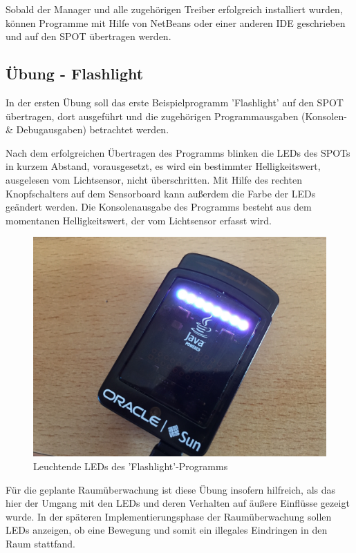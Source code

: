 Sobald der Manager und alle zugehörigen Treiber erfolgreich installiert wurden, können Programme mit Hilfe von NetBeans oder einer anderen IDE geschrieben und auf den SPOT übertragen werden.

\subsection{Übung - Flashlight}\label{s:Uebung1}

In der ersten Übung soll das erste Beispielprogramm 'Flashlight' auf den SPOT übertragen, dort ausgeführt und die zugehörigen Programmausgaben (Konsolen- \& Debugausgaben) betrachtet werden. 

Nach dem erfolgreichen Übertragen des Programms blinken die LEDs des SPOTs in kurzem Abstand, vorausgesetzt, es wird ein bestimmter Helligkeitswert, ausgelesen vom Lichtsensor, nicht überschritten. Mit Hilfe des rechten Knopfschalters auf dem Sensorboard kann außerdem die Farbe der LEDs geändert werden. Die Konsolenausgabe des Programms besteht aus dem momentanen Helligkeitswert, der vom Lichtsensor erfasst wird.

\begin{figure}[H] 
	\centering
	\includegraphics[scale=0.08]{Bilder/uebung1}
	\caption{Leuchtende LEDs des 'Flashlight'-Programms}
	\label{f:uebung1}
\end{figure}

Für die geplante Raumüberwachung ist diese Übung insofern hilfreich, als das hier der Umgang mit den LEDs und deren Verhalten auf äußere Einflüsse gezeigt wurde. In der späteren Implementierungsphase der Raumüberwachung sollen LEDs anzeigen, ob eine Bewegung und somit ein illegales Eindringen in den Raum stattfand.
